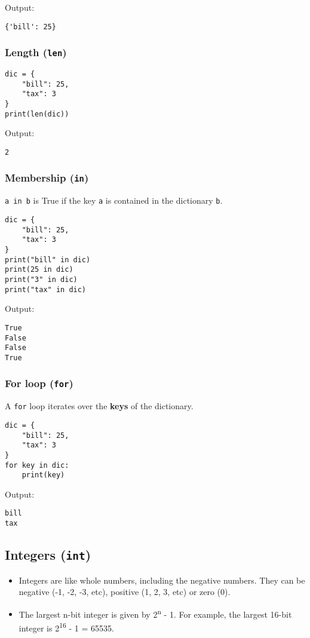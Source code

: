 \documentclass[11pt]{article}
\begin{document}
 \noindent Output:

\begin{verbatim}
{'bill': 25}
\end{verbatim}

\subsubsection{Length (\texttt{len})}
\label{sec:org4bf8592}
\begin{verbatim}
dic = {
    "bill": 25,
    "tax": 3
}
print(len(dic))
\end{verbatim}

 \noindent Output:

\begin{verbatim}
2
\end{verbatim}

\subsubsection{Membership (\texttt{in})}
\label{sec:org3f75b23}
\texttt{a in b} is True if the key \texttt{a} is contained in the dictionary \texttt{b}.
\begin{verbatim}
dic = {
    "bill": 25,
    "tax": 3
}
print("bill" in dic)
print(25 in dic)
print("3" in dic)
print("tax" in dic)
\end{verbatim}

 \noindent Output:

\begin{verbatim}
True
False
False
True
\end{verbatim}


 \newpage

\subsubsection{For loop (\texttt{for})}
\label{sec:org01a8bdc}
A \texttt{for} loop iterates over the \textbf{keys} of the dictionary.
\begin{verbatim}
dic = {
    "bill": 25,
    "tax": 3
}
for key in dic:
    print(key)
\end{verbatim}

 \noindent Output:

\begin{verbatim}
bill
tax
\end{verbatim}

\subsection{Integers (\texttt{int})}
\label{sec:org93a0c4a}
\begin{itemize}
\item Integers are like whole numbers, including the negative numbers. They can be negative (-1, -2, -3, etc), positive (1, 2, 3, etc) or zero (0).
\item The largest n-bit integer is given by 2\textsuperscript{n} - 1. For example, the largest 16-bit integer is 2\textsuperscript{16} - 1 = 65535.
\end{itemize}
\end{document}
